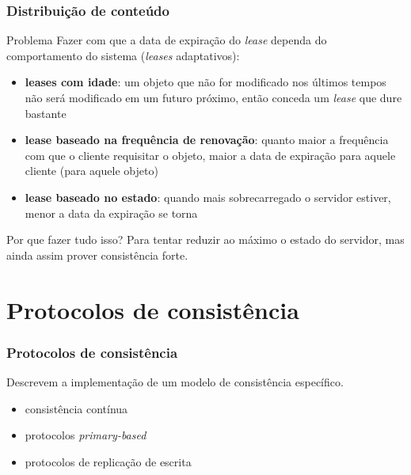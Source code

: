 \documentclass[Ligatures=TeX,table,brazil,svgnames,usetotalslideindicator,compress,10pt]{beamer}
\begin{document}
\begin{frame}
  \frametitle{Distribuição de conteúdo}
  \begin{block}{Problema}
    Fazer com que a data de expiração do \textit{lease} dependa do comportamento do sistema (\textit{leases} adaptativos):
    \begin{itemize}
    \item<2,5> \textbf{leases com idade}: um objeto que não for modificado nos últimos tempos não será modificado em um futuro próximo, então conceda um \textit{lease} que dure bastante
    \item<3,5> \textbf{lease baseado na frequência de renovação}: quanto maior a frequência com que o cliente requisitar o objeto, maior a data de expiração para aquele cliente (para aquele objeto)
    \item<4,5> \textbf{lease baseado no estado}: quando mais sobrecarregado o servidor estiver, menor a data da expiração se torna
    \end{itemize}

     Por que fazer tudo isso? Para tentar reduzir ao máximo o estado do servidor, mas ainda assim prover consistência forte.
  \end{block}
\end{frame}

\section{Protocolos de consistência}

\begin{frame}
  \frametitle{Protocolos de consistência}
  Descrevem a implementação de um modelo de consistência específico.
  \begin{itemize}
  \item consistência contínua
  \item protocolos \textit{primary-based}
  \item protocolos de replicação de escrita
  \end{itemize}
\end{frame}
\end{document}
